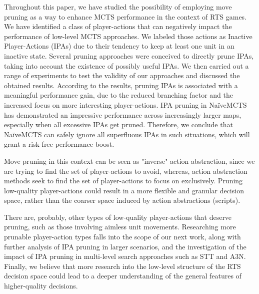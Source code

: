 \documentclass[conference]{IEEEtran}
\begin{document}
Throughout this paper, we have studied the possibility of employing move pruning as a way to enhance MCTS performance in the context of RTS games. We have identified a class of player-actions that can negatively impact the performance of low-level MCTS approaches. We labeled those actions as Inactive Player-Actions (IPAs) due to their tendency to keep at least one unit in an inactive state. Several pruning approaches were conceived to directly prune IPAs, taking into account the existence of possibly useful IPAs. We then carried out a range of experiments to test the validity of our approaches and discussed the obtained results. According to the results, pruning IPAs is associated with a meaningful performance gain, due to the reduced branching factor and the increased focus on more interesting player-actions. IPA pruning in NaïveMCTS has demonstrated an impressive performance across increasingly larger maps, especially when all excessive IPAs get pruned. Therefore, we conclude that NaïveMCTS can safely ignore all superfluous IPAs in such situations, which will grant a risk-free performance boost.

Move pruning in this context can be seen as "inverse" action abstraction, since we are trying to find the set of player-actions to avoid, whereas, action abstraction methods seek to find the set of player-actions to focus on exclusively. Pruning low-quality player-actions could result in a more flexible and granular decision space, rather than the coarser space induced by action abstractions (scripts).

There are, probably, other types of low-quality player-actions that deserve pruning, such as those involving aimless unit movements. Researching more prunable player-action types falls into the scope of our next work, along with further analysis of IPA pruning in larger scenarios, and the investigation of the impact of IPA pruning in multi-level search approaches such as STT\cite{barriga_combining_2017} and A3N\cite{moraes_action_2018}. Finally, we believe that more research into the low-level structure of the RTS decision space could lead to a deeper understanding of the general features of higher-quality decisions.




\end{document}

